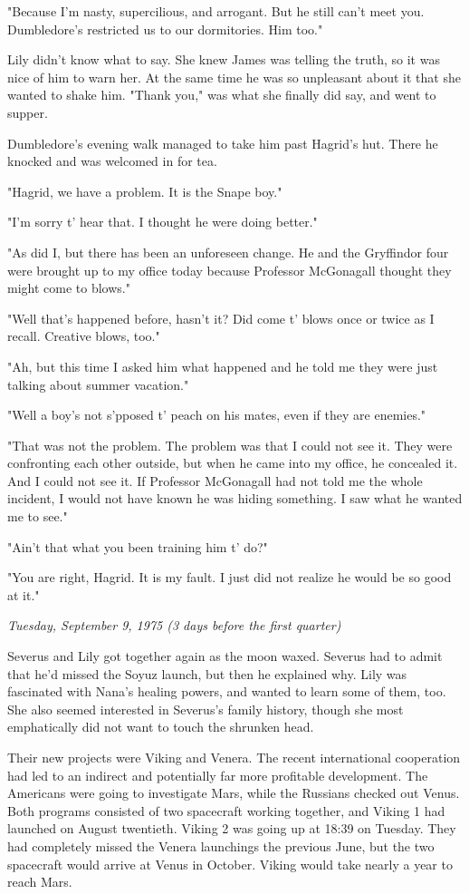 \documentclass[a4paper,11pt]{article}
\begin{document}
"Because I'm nasty, supercilious, and arrogant. But he still can't meet you. Dumbledore's restricted us to our dormitories. Him too."

Lily didn't know what to say. She knew James was telling the truth, so it was nice of him to warn her. At the same time he was so unpleasant about it that she wanted to shake him. "Thank you," was what she finally did say, and went to supper.

Dumbledore's evening walk managed to take him past Hagrid's hut. There he knocked and was welcomed in for tea.

"Hagrid, we have a problem. It is the Snape boy."

"I'm sorry t' hear that. I thought he were doing better."

"As did I, but there has been an unforeseen change. He and the Gryffindor four were brought up to my office today because Professor McGonagall thought they might come to blows."

"Well that's happened before, hasn't it? Did come t' blows once or twice as I recall. Creative blows, too."

"Ah, but this time I asked him what happened and he told me they were just talking about summer vacation."

"Well a boy's not s'pposed t' peach on his mates, even if they are enemies."

"That was not the problem. The problem was that I could not see it. They were confronting each other outside, but when he came into my office, he concealed it. And I could not see it. If Professor McGonagall had not told me the whole incident, I would not have known he was hiding something. I saw what he wanted me to see."

"Ain't that what you been training him t' do?"

"You are right, Hagrid. It is my fault. I just did not realize he would be so good at it."

\emph{Tuesday, September 9, 1975 (3 days before the first quarter)}

Severus and Lily got together again as the moon waxed. Severus had to admit that he'd missed the Soyuz launch, but then he explained why. Lily was fascinated with Nana's healing powers, and wanted to learn some of them, too. She also seemed interested in Severus's family history, though she most emphatically did not want to touch the shrunken head.

Their new projects were Viking and Venera. The recent international cooperation had led to an indirect and potentially far more profitable development. The Americans were going to investigate Mars, while the Russians checked out Venus. Both programs consisted of two spacecraft working together, and Viking 1 had launched on August twentieth. Viking 2 was going up at 18:39 on Tuesday. They had completely missed the Venera launchings the previous June, but the two spacecraft would arrive at Venus in October. Viking would take nearly a year to reach Mars.
\end{document}
